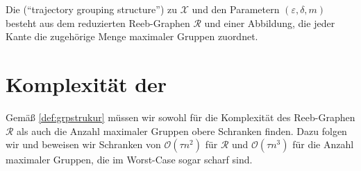 \begin{definition}[{name=[{\GrpStruktur}]},label=def:grpstrukur]
	Die \Index{\GrpStruktur} (\enquote{trajectory grouping structure}) zu $\mathcal{X}$ und den Parametern $(\varepsilon,\delta,m)$ besteht aus dem reduzierten Reeb-Graphen $\mathcal{R}$ und einer Abbildung, die jeder Kante die zugehörige Menge maximaler Gruppen zuordnet.
\end{definition}

\section{Komplexität der \GrpStruktur} %
\label{sec:komplex}
Gemäß \cref{def:grpstrukur} müssen wir sowohl für die Komplexität des Reeb-Graphen $\mathcal{R}$ als auch die Anzahl maximaler Gruppen obere Schranken finden.
Dazu folgen wir \textcite[Sec.~2.1~\&~2.2]{buchin2015} und beweisen wir Schranken von $\mathcal{O}(\tau n^2)$ für $\mathcal{R}$ und $\mathcal{O}(\tau n^3)$ für die Anzahl maximaler Gruppen, die im Worst-Case sogar scharf sind. 

